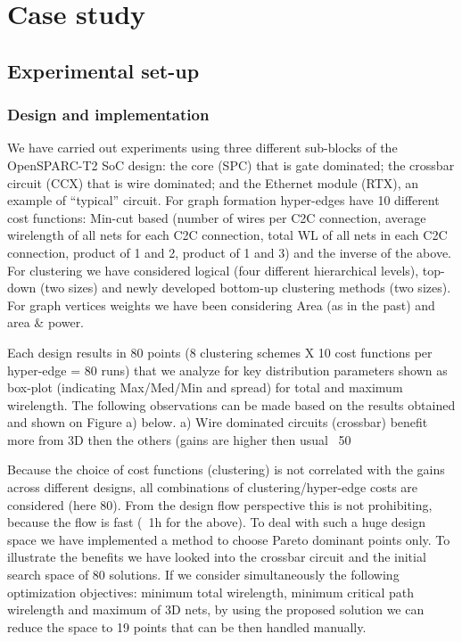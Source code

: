\section{Case study}
\subsection{Experimental set-up}
\subsubsection{Design and implementation}

We have carried out experiments using three different sub-blocks of the OpenSPARC-T2 SoC design: the core (SPC) that is gate dominated; the crossbar circuit (CCX) that is wire dominated; and the Ethernet module (RTX), an example of “typical” circuit. For graph formation hyper-edges have 10 different cost functions: Min-cut based (number of wires per C2C connection, average wirelength of all nets for each C2C connection, total WL of all nets in each C2C connection, product of 1 and 2, product of 1 and 3) and the inverse of the above. For clustering we have considered logical (four different hierarchical levels), top-down (two sizes) and newly developed bottom-up clustering methods (two sizes). For graph vertices weights we have been considering Area (as in the past) and area \& power.

Each design results in 80 points (8 clustering schemes X 10 cost functions per hyper-edge = 80 runs) that we analyze for key distribution parameters shown as box-plot (indicating Max/Med/Min and spread) for total and maximum wirelength. The following observations can be made based on the results obtained and shown on Figure a) below. a) Wire dominated circuits (crossbar) benefit more from 3D then the others (gains are higher then usual ~50%

Because the choice of cost functions (clustering) is not correlated with the gains across different designs, all combinations of clustering/hyper-edge costs are considered (here 80). From the design flow perspective this is not prohibiting, because the flow is fast (~1h for the above). To deal with such a huge design space we have implemented a method to choose Pareto dominant points only. To illustrate the benefits we have looked into the crossbar circuit and the initial search space of 80 solutions. If we consider simultaneously the following optimization objectives: minimum total wirelength, minimum critical path wirelength and maximum of 3D nets, by using the proposed solution we can reduce the space to 19 points that can be then handled manually.

